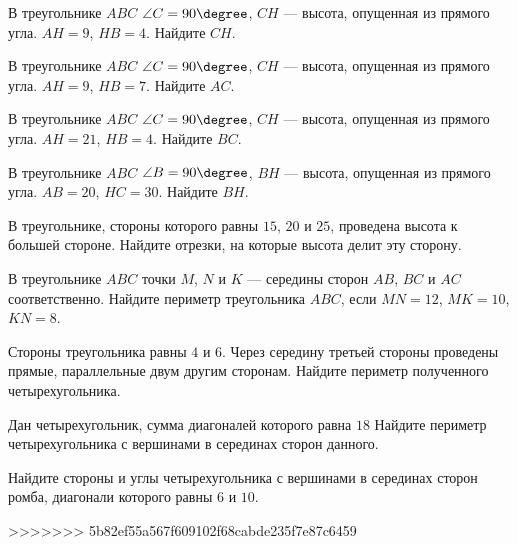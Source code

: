 \begin{consultation}[number=1]
	\begin{listofex}
		\item В треугольнике \( ABC \) \( \angle C=90\degree \), \( CH \) --- высота, опущенная из прямого угла. \( AH=9 \), \( HB=4 \). Найдите \( CH \).
		\item В треугольнике \( ABC \) \( \angle C=90\degree \), \( CH \) --- высота, опущенная из прямого угла. \( AH=9 \), \( HB=7 \). Найдите \( AC \).
		\item В треугольнике \( ABC \) \( \angle C=90\degree \), \( CH \) --- высота, опущенная из прямого угла. \( AH=21 \), \( HB=4 \). Найдите \( BC \).
		\item В треугольнике \( ABC \) \( \angle B=90\degree \), \( BH \) --- высота, опущенная из прямого угла. \( AB=20 \), \( HC=30 \). Найдите \( BH \).
		\item В треугольнике, стороны которого равны \( 15 \), \( 20 \) и \( 25 \), проведена высота к большей стороне. Найдите отрезки, на которые высота делит эту сторону.
		\item В треугольнике \( ABC \) точки \( M \), \( N \) и \( K \) --- середины сторон \( AB \), \( BC \) и \( AC \) соответственно. Найдите периметр треугольника \( ABC \), если \( MN=12 \), \( MK=10 \), \( KN=8 \).
		\item Стороны треугольника равны \( 4 \) и \( 6 \). Через середину третьей стороны проведены прямые, параллельные двум другим сторонам. Найдите периметр полученного четырехугольника.
		\item Дан четырехугольник, сумма диагоналей которого равна \( 18 \) Найдите периметр четырехугольника с вершинами в серединах сторон данного.
		\item Найдите стороны и углы четырехугольника с вершинами в серединах сторон ромба, диагонали которого равны \( 6 \) и \( 10 \).
	\end{listofex}
\end{consultation}
>>>>>>> 5b82ef55a567f609102f68cabde235f7e87c6459
